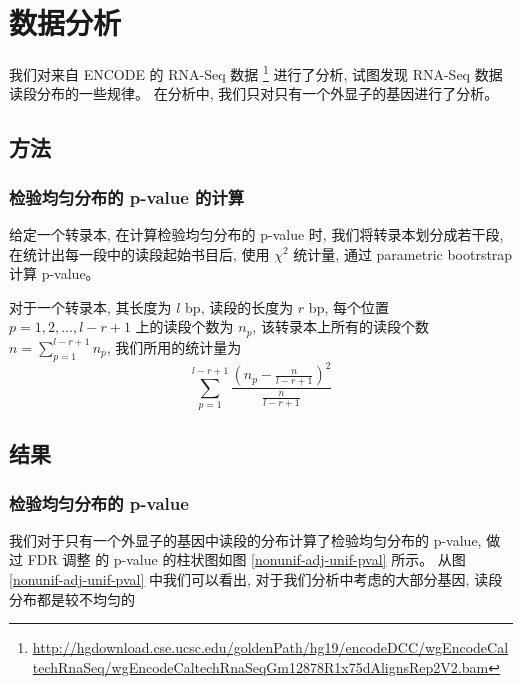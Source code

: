 \section{数据分析}
我们对来自 ENCODE \cite{encode} 的 RNA-Seq 数据 
\footnote{\url{http://hgdownload.cse.ucsc.edu/goldenPath/hg19/encodeDCC/wgEncodeCaltechRnaSeq/wgEncodeCaltechRnaSeqGm12878R1x75dAlignsRep2V2.bam}} 
进行了分析, 试图发现 RNA-Seq 数据读段分布的一些规律。 
在分析中, 我们只对只有一个外显子的基因进行了分析。

\subsection{方法}
\subsubsection{检验均匀分布的 p-value 的计算}
给定一个转录本, 在计算检验均匀分布的 p-value 时, 
我们将转录本划分成若干段, 在统计出每一段中的读段起始书目后, 使用 $\chi^2$ 统计量, 
通过 parametric bootrstrap \cite{efron1993introduction} 计算 p-value。 

对于一个转录本, 其长度为 $l$ bp, 读段的长度为 $r$ bp, 
每个位置 $p=1,2,\ldots,l-r+1$ 上的读段个数为 $n_p$, 
该转录本上所有的读段个数 $n=\sum_{p=1}^{l-r+1}n_p$, 
我们所用的统计量为 
\begin{equation}
\sum_{p=1}^{l-r+1} \frac{(n_p-\frac{n}{l-r+1})^2}{\frac{n}{l-r+1}}
\end{equation}

\subsection{结果}
\subsubsection{检验均匀分布的 p-value}
我们对于只有一个外显子的基因中读段的分布计算了检验均匀分布的 p-value, 
做过 FDR 调整 \cite{benjamini1995controlling} 的 p-value 
的柱状图如图 \ref{nonunif-adj-unif-pval} 所示。 
从图 \ref{nonunif-adj-unif-pval} 中我们可以看出, 
对于我们分析中考虑的大部分基因, 读段分布都是较不均匀的

